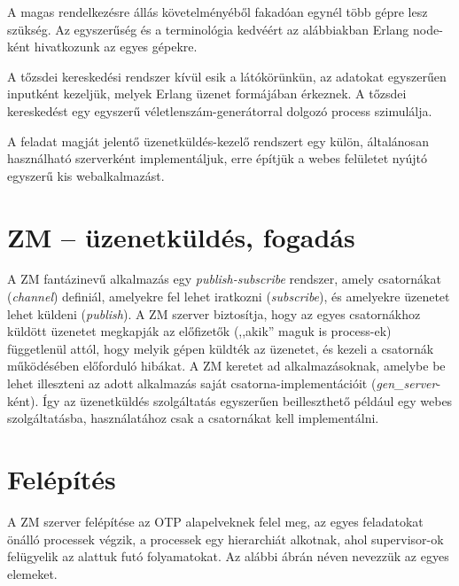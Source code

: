 \documentclass[12pt, a4paper, oneside]{book}
\begin{document}
A magas rendelkezésre állás követelményéből fakadóan egynél több gépre lesz
szükség. Az egyszerűség és a terminológia kedvéért az alábbiakban Erlang
node-ként hivatkozunk az egyes gépekre.

A tőzsdei kereskedési rendszer kívül esik a látókörünkün, az adatokat
egyszerűen inputként kezeljük, melyek Erlang üzenet formájában érkeznek. A
tőzsdei kereskedést egy egyszerű véletlenszám-generátorral dolgozó process
szimulálja.

A feladat magját jelentő üzenetküldés-kezelő rendszert egy külön, általánosan
használható szerverként implementáljuk, erre építjük a webes felületet nyújtó
egyszerű kis webalkalmazást.

\section{ZM -- üzenetküldés, fogadás}
A ZM fantázinevű alkalmazás egy \emph{publish-subscribe} rendszer, amely
csatornákat (\emph{channel}) definiál, amelyekre fel lehet iratkozni
(\emph{subscribe}), és amelyekre üzenetet lehet küldeni (\emph{publish}). A ZM
szerver biztosítja, hogy az egyes csatornákhoz küldött üzenetet megkapják az
előfizetők (,,akik'' maguk is process-ek) függetlenül attól, hogy melyik gépen
küldték az üzenetet, és kezeli a csatornák működésében előforduló hibákat. A ZM
keretet ad alkalmazásoknak, amelybe be lehet illeszteni az adott alkalmazás
saját csatorna-implementációit (\emph{gen\_server}-ként). Így az üzenetküldés
szolgáltatás egyszerűen beilleszthető például egy webes szolgáltatásba,
használatához csak a csatornákat kell implementálni.

\section{Felépítés}
A ZM szerver felépítése az OTP alapelveknek felel meg, az egyes feladatokat
önálló processek végzik, a processek egy hierarchiát alkotnak, ahol
supervisor-ok felügyelik az alattuk futó folyamatokat. Az alábbi ábrán néven
nevezzük az egyes elemeket.
\end{document}
